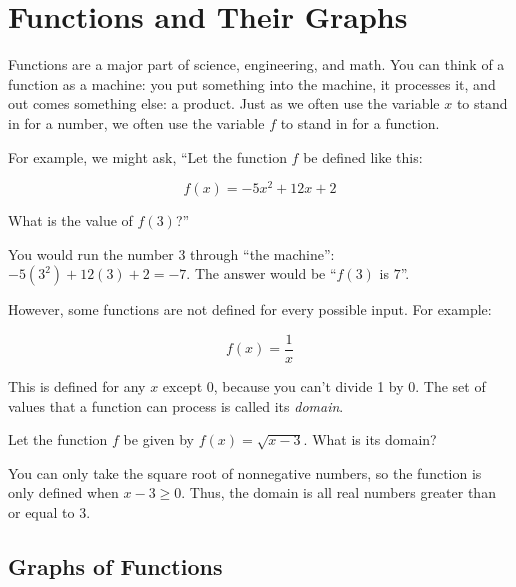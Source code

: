 \chapter{Functions and Their Graphs}

Functions are a major part of science, engineering, and math. You can think of a function as a machine: you put something into the
machine, it processes it, and out comes something else: a product. Just as we
often use the variable $x$ to stand in for a number, we often use the
variable $f$ to stand in for a function.

For example, we might ask, ``Let the function $f$ be defined like this:

\begin{equation*}
f(x) = -5x^2 + 12x + 2
\end{equation*}

What is the value of $f(3)$?''

You would run the number 3 through ``the machine'': $-5(3^2) + 12(3) + 2 = -7$. The answer would be ``$f(3)$ is $7$''.

However, some functions are not defined for every possible input. For example:

\begin{equation*}
  f(x) = \frac{1}{x}
\end{equation*}

  This is defined for any $x$ except 0, because you can't divide 1 by 0. The set of values that a function can process is called its \textit{domain}.

\begin{Exercise}[title={Domain of a function}, label=function_domain]

  Let the function $f$ be given by $f(x) = \sqrt{x - 3}$.  What is its domain?

\end{Exercise}
\begin{Answer}[ref=function_domain]
  You can only take the square root of nonnegative numbers, so the
  function is only defined when $x - 3 \geq 0$.  Thus, the domain is
  all real numbers greater than or equal to 3.
\end{Answer}

\section{Graphs of Functions}

